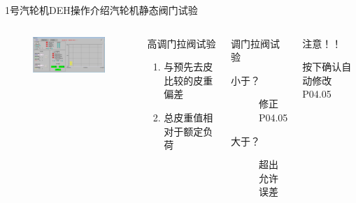 \documentclass[12pt,hyperref={CJKbookmarks=true}]{beamer} %
\begin{document}
\begin{frame}{1号汽轮机DEH操作介绍}{汽轮机静态阀门试验}
  		\begin{columns}
\begin{figure}
\includegraphics[angle=0,width=150pt,trim=0 0 0 0,clip]{pic/tiaomenjingtaishiyan.png}
	
\end{figure}
\begin{block}{高调门拉阀试验}
			\begin{enumerate}
				\item  与预先去皮比较的皮重偏差
				\item  总皮重值相对于额定负荷
				\end{enumerate}
\end{block}
\begin{block}{调门拉阀试验}
			\begin{description}
				\item[小于？]修正P04.05
				\item[大于？]超出允许误差
				\end{description}
\end{block}
\begin{alertblock}{注意！！}
			
				按下确认自动修改P04.05
\end{alertblock}
		\end{columns}
\end{frame}
\end{document}
